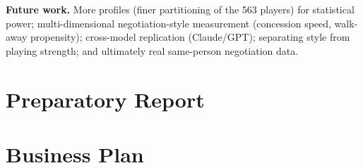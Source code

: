 \documentclass[11pt, a4paper, oneside, openany]{report}
\begin{document}
\textbf{Future work.} More profiles (finer partitioning of the 563 players)
for statistical power; multi-dimensional negotiation-style measurement
(concession speed, walk-away propensity); cross-model replication
(Claude/GPT); separating style from playing strength; and ultimately real
same-person negotiation data.

\part{Preparatory Report}


\part{Business Plan}

\end{document}
